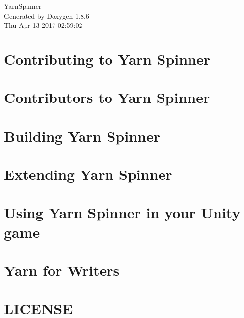 \documentclass[twoside]{book}
\newcommand{\clearemptydoublepage}{%
  \newpage{\pagestyle{empty}\cleardoublepage}%
}
\begin{document}
\hypersetup{pageanchor=false}
\begin{titlepage}
\vspace*{7cm}
\begin{center}%
{\Large Yarn\-Spinner }\\
\vspace*{1cm}
{\large Generated by Doxygen 1.8.6}\\
\vspace*{0.5cm}
{\small Thu Apr 13 2017 02:59:02}\\
\end{center}
\end{titlepage}
\clearemptydoublepage
\tableofcontents
\clearemptydoublepage
{}
\hypersetup{pageanchor=true}

\chapter{Contributing to Yarn Spinner}
\label{d7/d46/a00002}
\hypertarget{d7/d46/a00002}{}

\chapter{Contributors to Yarn Spinner}
\label{d0/d0b/a00004}
\hypertarget{d0/d0b/a00004}{}

\chapter{Building Yarn Spinner}
\label{de/d21/a00006}
\hypertarget{de/d21/a00006}{}

\chapter{Extending Yarn Spinner}
\label{d4/dee/a00008}
\hypertarget{d4/dee/a00008}{}

\chapter{Using Yarn Spinner in your Unity game}
\label{d7/dec/a00010}
\hypertarget{d7/dec/a00010}{}

\chapter{Yarn for Writers}
\label{df/d86/a00012}
\hypertarget{df/d86/a00012}{}

\chapter{L\-I\-C\-E\-N\-S\-E}
\label{d2/de7/a00014}
\hypertarget{d2/de7/a00014}{}

\end{document}

